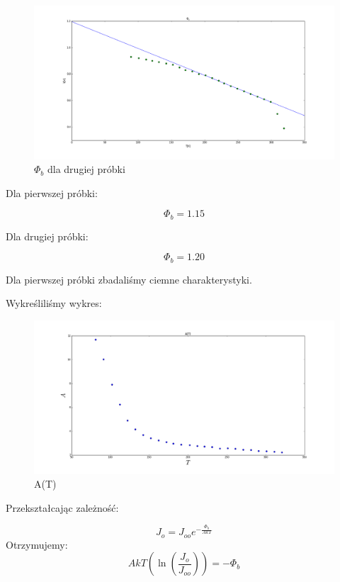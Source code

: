 \documentclass[a4paper,12pt]{article}
\begin{document}
\begin{figure} [H]
  \begin{center}
    \includegraphics[width = 15cm]{probka2_phi_b.png}
    \caption{$\Phi_b$ dla drugiej próbki}
  \end{center}
\end{figure}

Dla pierwszej próbki:

$$\Phi_b = 1.15$$

Dla drugiej próbki:

$$\Phi_b = 1.20$$

Dla pierwszej próbki zbadaliśmy ciemne charakterystyki.

Wykreśliliśmy wykres: 

\begin{figure} [H]
  \begin{center}
    \includegraphics[width = 15cm]{A_T.png}
    \caption{A(T)}
  \end{center}
\end{figure}

Przekształcając zależność:

$$ J_o = J_{oo}e^{-\frac{\Phi_b}{AkT}}$$
Otrzymujemy:
$$ AkT \left( \ln{(\frac{J_o}{J_{oo}})} \right) =-\Phi_b  $$ 
\end{document}
